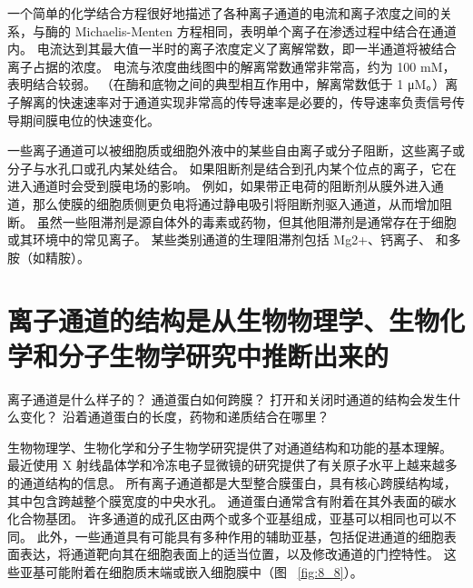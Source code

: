 一个简单的化学结合方程很好地描述了各种离子通道的电流和离子浓度之间的关系，与酶的 Michaelis-Menten 方程相同，表明单个离子在渗透过程中结合在通道内。
电流达到其最大值一半时的离子浓度定义了离解常数，即一半通道将被结合离子占据的浓度。
电流与浓度曲线图中的解离常数通常非常高，约为 100 mM，表明结合较弱。 （在酶和底物之间的典型相互作用中，解离常数低于 1 μM。）离子解离的快速速率对于通道实现非常高的传导速率是必要的，传导速率负责信号传导期间膜电位的快速变化。


一些离子通道可以被细胞质或细胞外液中的某些自由离子或分子阻断，这些离子或分子与水孔口或孔内某处结合。 如果阻断剂是结合到孔内某个位点的离子，它在进入通道时会受到膜电场的影响。
例如，如果带正电荷的阻断剂从膜外进入通道，那么使膜的细胞质侧更负电将通过静电吸引将阻断剂驱入通道，从而增加阻断。
虽然一些阻滞剂是源自体外的毒素或药物，但其他阻滞剂是通常存在于细胞或其环境中的常见离子。
某些类别通道的生理阻滞剂包括 Mg2+、钙离子、 和多胺（如精胺）。



\section{离子通道的结构是从生物物理学、生物化学和分子生物学研究中推断出来的}

离子通道是什么样子的？
通道蛋白如何跨膜？
打开和关闭时通道的结构会发生什么变化？
沿着通道蛋白的长度，药物和递质结合在哪里？


生物物理学、生物化学和分子生物学研究提供了对通道结构和功能的基本理解。
最近使用 X 射线晶体学和冷冻电子显微镜的研究提供了有关原子水平上越来越多的通道结构的信息。
所有离子通道都是大型整合膜蛋白，具有核心跨膜结构域，其中包含跨越整个膜宽度的中央水孔。
通道蛋白通常含有附着在其外表面的碳水化合物基团。 许多通道的成孔区由两个或多个亚基组成，亚基可以相同也可以不同。
此外，一些通道具有可能具有多种作用的辅助亚基，包括促进通道的细胞表面表达，将通道靶向其在细胞表面上的适当位置，以及修改通道的门控特性。
这些亚基可能附着在细胞质末端或嵌入细胞膜中（图 ~\ref{fig:8_8}）。


